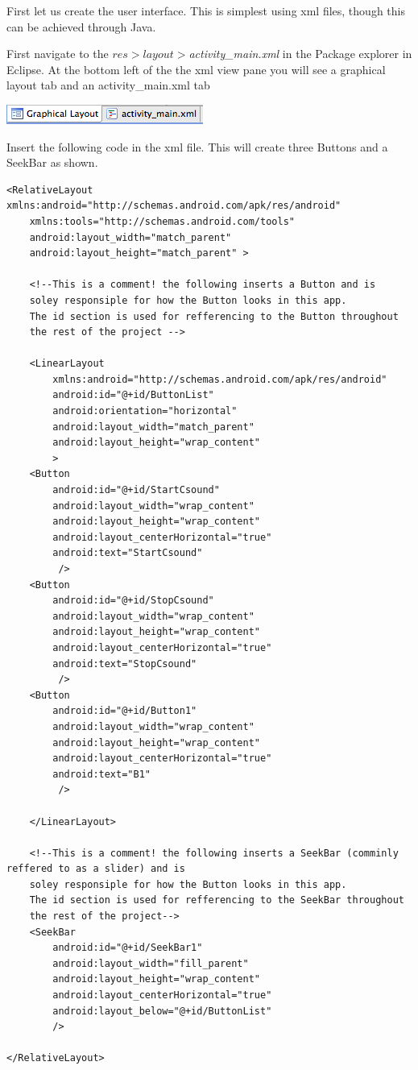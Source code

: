 \documentclass[11pt]{article}
\begin{document}
 First let us create the user interface. This is simplest using xml files, though this can be achieved through Java.

First navigate to the $res>layout>$\textit{activity_main.xml} in the Package explorer in Eclipse. At the bottom left of the the xml view pane you will see a graphical layout tab and an activity_main.xml tab
\begin{center}
\includegraphics{images/xmlTabBar}
\end{center}

Insert the following code in the xml file. This will create three Buttons and a SeekBar as shown.
\begin{lstlisting}[caption=Code to create UI]
<RelativeLayout xmlns:android="http://schemas.android.com/apk/res/android"
    xmlns:tools="http://schemas.android.com/tools"
    android:layout_width="match_parent"
    android:layout_height="match_parent" >
    
    <!--This is a comment! the following inserts a Button and is 
    soley responsiple for how the Button looks in this app.
    The id section is used for refferencing to the Button throughout
    the rest of the project -->
    
    <LinearLayout 
        xmlns:android="http://schemas.android.com/apk/res/android"
        android:id="@+id/ButtonList"
        android:orientation="horizontal"
        android:layout_width="match_parent"
        android:layout_height="wrap_content"
        >
    <Button
        android:id="@+id/StartCsound"
        android:layout_width="wrap_content"
        android:layout_height="wrap_content"
        android:layout_centerHorizontal="true"
        android:text="StartCsound"
         />
    <Button
        android:id="@+id/StopCsound"
        android:layout_width="wrap_content"
        android:layout_height="wrap_content"
        android:layout_centerHorizontal="true"
        android:text="StopCsound"
         />
    <Button
        android:id="@+id/Button1"
        android:layout_width="wrap_content"
        android:layout_height="wrap_content"
        android:layout_centerHorizontal="true"
        android:text="B1"
         />
    
    </LinearLayout>
    
    <!--This is a comment! the following inserts a SeekBar (comminly reffered to as a slider) and is 
    soley responsiple for how the Button looks in this app.
    The id section is used for refferencing to the SeekBar throughout
    the rest of the project-->
    <SeekBar
        android:id="@+id/SeekBar1" 
        android:layout_width="fill_parent"
        android:layout_height="wrap_content"
        android:layout_centerHorizontal="true"
        android:layout_below="@+id/ButtonList"
        />

</RelativeLayout>
\end{lstlisting}
\end{document}
